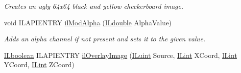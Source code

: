 \begin{DoxyCompactItemize}
\begin{DoxyCompactList}\small\item\em Creates an ugly 64x64 black and yellow checkerboard image. \end{DoxyCompactList}\item 
void I\+L\+A\+P\+I\+E\+N\+T\+R\+Y \hyperlink{group__image__manip_gaca8654129c04ebccba49f71d7e13edfe}{il\+Mod\+Alpha} (\hyperlink{group__il__types_ga3896ba656038eb34345347cd095b020a}{I\+Ldouble} Alpha\+Value)
\begin{DoxyCompactList}\small\item\em Adds an alpha channel if not present and sets it to the given value. \end{DoxyCompactList}\item 
\hypertarget{group__image__manip_ga2e07d47b40a202e9fdf26d49e8dcdd4c}{\hyperlink{group__il__types_gaa6aa7c95cfdc06b4d8601ef832b7bb0a}{I\+Lboolean} I\+L\+A\+P\+I\+E\+N\+T\+R\+Y \hyperlink{group__image__manip_ga2e07d47b40a202e9fdf26d49e8dcdd4c}{il\+Overlay\+Image} (\hyperlink{group__il__types_gaff8e86a1072c8d7cfe387fb87c6ed8e1}{I\+Luint} Source, \hyperlink{group__il__types_ga8effe51a00daaa0878631e5af75a36cb}{I\+Lint} X\+Coord, \hyperlink{group__il__types_ga8effe51a00daaa0878631e5af75a36cb}{I\+Lint} Y\+Coord, \hyperlink{group__il__types_ga8effe51a00daaa0878631e5af75a36cb}{I\+Lint} Z\+Coord)}\label{group__image__manip_ga2e07d47b40a202e9fdf26d49e8dcdd4c}


\end{DoxyCompactItemize}
